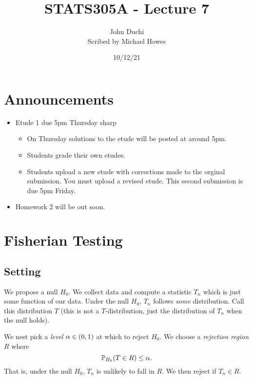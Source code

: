 




\title{STATS305A - Lecture 7}
\author{John Duchi\\ Scribed by Michael Howes}
\date{10/12/21}

\pagestyle{fancy}
\fancyhf{}


\maketitle
\tableofcontents

\section{Announcements}
\begin{itemize}
    \item Etude 1 due 5pm Thursday sharp
    \begin{itemize}
        \item On Thursday solutions to the etude will be posted at around 5pm.
        \item Students grade their own etudes.
        \item Students upload a new etude with corrections made to the orginal submission. You must upload a revised etude. This second submission is due 5pm Friday.
    \end{itemize}
    \item Homework 2 will be out soon.
\end{itemize}

\section{Fisherian Testing}
\subsection{Setting} 

We propose a null $H_0$. We collect data and compute a statistic $T_n$ which is just some function of our data. Under the null $H_0$, $T_n$ follows \emph{some} distribution. Call this distribution $T$ (this is not a $T$-distribution, just the distribution of $T_n$ when the null holds).

We nest pick a \emph{level} ${\alpha} \in (0,1)$ at which to reject $H_0$. We choose a \emph{rejection region} $R$ where 
\[{\mathbb{P}}_{H_0}(T \in R) \le {\alpha}. \]
That is, under the null $H_0$, $T_n$ is unlikely to fall in $R$. We then reject if $T_n \in R$.

